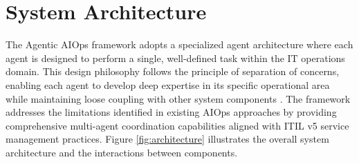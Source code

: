 \documentclass{article}
\begin{document}
\section{System Architecture}

The Agentic AIOps framework adopts a specialized agent architecture where each agent is designed to perform a single, well-defined task within the IT operations domain. This design philosophy follows the principle of separation of concerns, enabling each agent to develop deep expertise in its specific operational area while maintaining loose coupling with other system components \cite{dijkstra1982}. The framework addresses the limitations identified in existing AIOps approaches by providing comprehensive multi-agent coordination capabilities aligned with ITIL v5 service management practices. Figure \ref{fig:architecture} illustrates the overall system architecture and the interactions between components.
\end{document}
